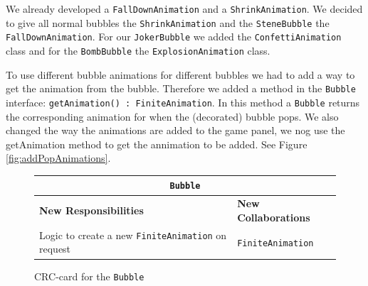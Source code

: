 \documentclass[a4paper]{article}
\begin{document}
We already developed a \texttt{FallDownAnimation} and a \texttt{ShrinkAnimation}. We decided to give all normal bubbles the \texttt{ShrinkAnimation} and the \texttt{SteneBubble} the \texttt{FallDownAnimation}. For our \texttt{JokerBubble} we added the \texttt{ConfettiAnimation} class and for the \texttt{BombBubble} the \texttt{ExplosionAnimation} class.

To use different bubble animations for different bubbles we had to add a way to get the animation from the bubble. Therefore we added a method in the \texttt{Bubble} interface: \texttt{getAnimation() : FiniteAnimation}. In this method a \texttt{Bubble} returns the corresponding animation for when the (decorated) bubble pops. We also changed the way the animations are added to the game panel, we nog use the getAnimation method to get the annimation to be added. See Figure \ref{fig:addPopAnimations}.

\begin{figure}[H]
	\centering
	\begin{tabular}{ | p{8cm} | p{4cm} | }
      \multicolumn{2}{c}{\texttt{Bubble}} \\ \hline
      \textbf{New Responsibilities} & \textbf{New Collaborations} \\ \hline
      Logic to create a new  \texttt{FiniteAnimation} on request & \texttt{FiniteAnimation} \\
      \hline
    \end{tabular}
    \caption{CRC-card for the \texttt{Bubble}}
\end{figure}

%
%
\end{document}
